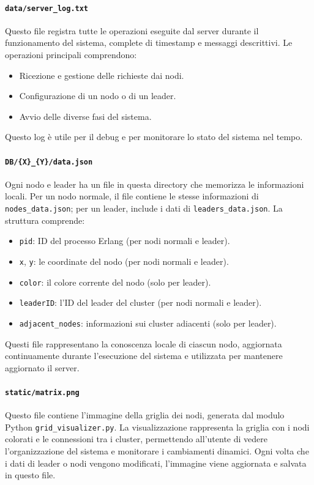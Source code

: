 \documentclass[12pt, a4paper]{report}
\begin{document}
\paragraph{\texttt{data/server\_log.txt}} Questo file registra tutte le operazioni eseguite dal server durante il funzionamento del sistema, complete di timestamp e messaggi descrittivi. Le operazioni principali comprendono:
\begin{itemize}
    \item Ricezione e gestione delle richieste dai nodi.
    \item Configurazione di un nodo o di un leader.
    \item Avvio delle diverse fasi del sistema.
\end{itemize}
Questo log \`e utile per il debug e per monitorare lo stato del sistema nel tempo.

\paragraph{\texttt{DB/\{X\}\_\{Y\}/data.json}} Ogni nodo e leader ha un file in questa directory che memorizza le informazioni locali. Per un nodo normale, il file contiene le stesse informazioni di \texttt{nodes\_data.json}; per un leader, include i dati di \texttt{leaders\_data.json}. La struttura comprende:
\begin{itemize}
    \item \texttt{pid}: ID del processo Erlang (per nodi normali e leader).
    \item \texttt{x}, \texttt{y}: le coordinate del nodo (per nodi normali e leader).
    \item \texttt{color}: il colore corrente del nodo (solo per leader).
    \item \texttt{leaderID}: l'ID del leader del cluster (per nodi normali e leader).
    \item \texttt{adjacent\_nodes}: informazioni sui cluster adiacenti (solo per leader).
\end{itemize}
Questi file rappresentano la conoscenza locale di ciascun nodo, aggiornata continuamente durante l’esecuzione del sistema e utilizzata per mantenere aggiornato il server.

\paragraph{\texttt{static/matrix.png}} Questo file contiene l'immagine della griglia dei nodi, generata dal modulo Python \texttt{grid\_visualizer.py}. La visualizzazione rappresenta la griglia con i nodi colorati e le connessioni tra i cluster, permettendo all'utente di vedere l'organizzazione del sistema e monitorare i cambiamenti dinamici. Ogni volta che i dati di leader o nodi vengono modificati, l'immagine viene aggiornata e salvata in questo file.
\end{document}
